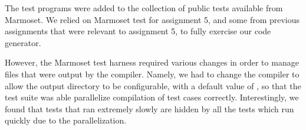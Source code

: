 \documentclass[pdftex,11pt,a4paper]{article}
\begin{document}
The test programs were added to the collection of public tests
available from Marmoset. We relied on Marmoset test for assignment 5,
and some from previous assignments that were relevant to assignment 5,
to fully exercise our code generator.

However, the Marmoset test harness required various changes in order
to manage files that were output by the compiler. Namely, we had to
change the compiler to allow the output directory to be configurable,
with a default value of , so that the test suite was able
parallelize compilation of test cases correctly. Interestingly, we
found that tests that ran extremely slowly are hidden by all the tests
which run quickly due to the parallelization.
\end{document}
